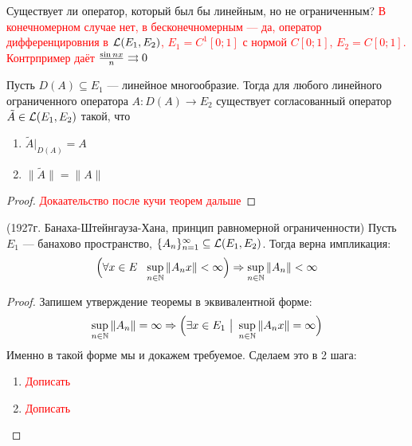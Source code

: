 \begin{example}
	Существует ли оператор, который был бы линейным, но не ограниченным?
	\textcolor{red}{В конечномерном случае нет, в бесконечномерным --- да, оператор дифференцировния в $\mathcal{L}(E_1, E_2)$, $E_1 = C^1[0; 1]$ с нормой $C[0; 1]$, $E_2 = C[0; 1]$. Контрпример даёт $\frac{\sin nx}{n} \rightrightarrows 0$}
\end{example}

\begin{theorem}
	Пусть $D(A) \subseteq E_1$ --- линейное многообразие. Тогда для любого линейного ограниченного оператора $A \colon D(A) \to E_2$ существует согласованный оператор $\tilde{A} \in \mathcal{L}(E_1, E_2)$ такой, что
	\begin{enumerate}
		\item $\tilde{A}|_{D(A)} = A$
		
		\item $\|\tilde{A}\| = \|A\|$
	\end{enumerate}
\end{theorem}

\begin{proof}
	\textcolor{red}{Докаательство после кучи теорем дальше}
\end{proof}

\begin{theorem} (1927г. Банаха-Штейнгауза-Хана, принцип равномерной ограниченности)
	Пусть $E_1$ --- банахово пространство, $\{A_n\}_{n = 1}^\infty \subseteq \mathcal{L}(E_1, E_2)$. Тогда верна импликация:
	\[
		\Big(\forall x \in E\ \ \sup_{n \in \mathbb{N}} \|A_n x\| < \infty\Big) \Rightarrow \sup_{n \in \mathbb{N}} \|A_n\| < \infty
	\]
\end{theorem}

\begin{proof}
	Запишем утверждение теоремы в эквивалентной форме:
	\[
		\sup_{n \in \mathbb{N}} \|A_n\| = \infty \Rightarrow \Big(\exists x \in E_1 \ \big|\  \sup_{n \in \mathbb{N}} \|A_nx\| = \infty\Big)
	\]
	Именно в такой форме мы и докажем требуемое. Сделаем это в 2 шага:
	\begin{enumerate}
		\item \textcolor{red}{Дописать}
		
		\item \textcolor{red}{Дописать}
	\end{enumerate}
\end{proof}
